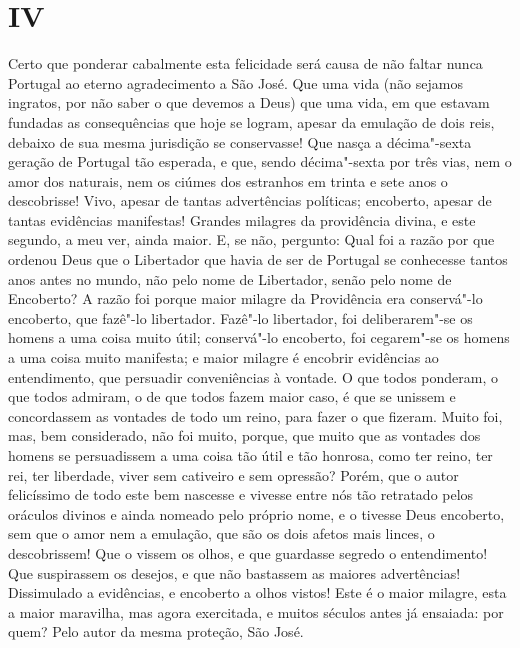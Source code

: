 \section{IV}

Certo que ponderar cabalmente esta felicidade será causa de não faltar
nunca Portugal ao eterno agradecimento a São José. Que uma vida (não
sejamos ingratos, por não saber o que devemos a Deus) que uma vida, em
que estavam fundadas as consequências que hoje se logram, apesar da
emulação de dois reis, debaixo de sua mesma jurisdição se conservasse!
Que nasça a décima"-sexta geração de Portugal tão esperada, e que, sendo
décima"-sexta por três vias, nem o amor dos naturais, nem os ciúmes dos
estranhos em trinta e sete anos o descobrisse! Vivo, apesar de tantas
advertências políticas; encoberto, apesar de tantas evidências
manifestas! Grandes milagres da providência divina, e este segundo, a
meu ver, ainda maior. E, se não, pergunto: Qual foi a razão por que
ordenou Deus que o Libertador que havia de ser de Portugal se conhecesse
tantos anos antes no mundo, não pelo nome de Libertador, senão pelo nome
de Encoberto? A razão foi porque maior milagre da Providência era
conservá"-lo encoberto, que fazê"-lo libertador. Fazê"-lo libertador, foi
deliberarem"-se os homens a uma coisa muito útil; conservá"-lo encoberto,
foi cegarem"-se os homens a uma coisa muito manifesta; e maior milagre é
encobrir evidências ao entendimento, que persuadir conveniências à
vontade. O que todos ponderam, o que todos admiram, o de que todos fazem
maior caso, é que se unissem e concordassem as vontades de todo um
reino, para fazer o que fizeram. Muito foi, mas, bem considerado, não
foi muito, porque, que muito que as vontades dos homens se persuadissem
a uma coisa tão útil e tão honrosa, como ter reino, ter rei, ter
liberdade, viver sem cativeiro e sem opressão? Porém, que o autor
felicíssimo de todo este bem nascesse e vivesse entre nós tão retratado
pelos oráculos divinos e ainda nomeado pelo próprio nome, e o tivesse
Deus encoberto, sem que o amor nem a emulação, que são os dois afetos
mais linces, o descobrissem! Que o vissem os olhos, e que guardasse
segredo o entendimento! Que suspirassem os desejos, e que não bastassem
as maiores advertências! Dissimulado a evidências, e encoberto a olhos
vistos! Este é o maior milagre, esta a maior maravilha, mas agora
exercitada, e muitos séculos antes já ensaiada: por quem? Pelo autor da
mesma proteção, São José.

